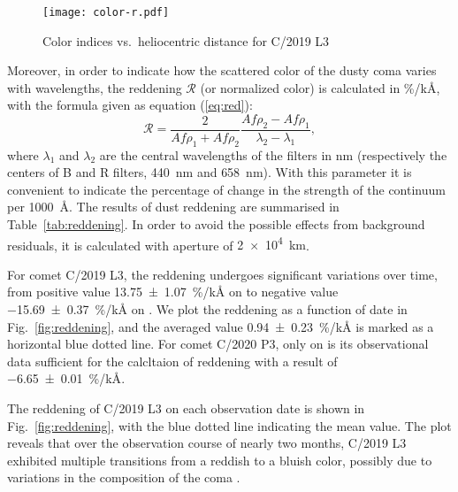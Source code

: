 \begin{figure}
    \centering
    \texttt{[image: color-r.pdf]} 
    \caption{Color indices vs.\ heliocentric distance for C/2019 L3}\label{fig:color-r}
\end{figure}

Moreover, in order to indicate how the scattered color of the dusty coma varies with wavelengths, the reddening $\mathcal{R}$ (or normalized color) \citep{jewitt_cometary_1986, lara_behaviour_2003, mazzotta_epifani_dust_2011, shi_ccd_2015} is calculated in \si{\percent/\kilo\angstrom}, with the formula given as equation (\ref{eq:red}): 
\begin{equation}
\mathcal{R} = \frac{2}{Af\rho_1 + Af\rho_2} \frac{Af\rho_2 - Af\rho_1}{\lambda_2 - \lambda_1}, 
\label{eq:red}
\end{equation}
where $\lambda_1$ and $\lambda_2$ are the central wavelengths of the filters in \si{\nm} (respectively the centers of B and R filters, {\SI{440}{\nm}} and {\SI{658}{\nm}}). With this parameter it is convenient to indicate the percentage of change in the strength of the continuum per {\SI{1000}{\angstrom}}. The results of dust reddening are summarised in Table~\ref{tab:reddening}. In order to avoid the possible effects from background residuals, it is calculated with aperture of {\SI{2e4}{\km}}. 

For comet C/2019 L3, the reddening undergoes significant variations over time, from positive value {\SI{13.75 +- 1.07}{\percent/\kilo\angstrom}} on  to negative value {\SI{-15.69 +- 0.37}{\percent/\kilo\angstrom}} on . We plot the reddening as a function of date in Fig.~\ref{fig:reddening}, and the averaged value {\SI{0.94 +- 0.23}{\percent/\kilo\angstrom}} is marked as a horizontal blue dotted line. For comet C/2020 P3, only on  is its observational data sufficient for the calcltaion of reddening with a result of {\SI{-6.65 +- 0.01}{\percent/\kilo\angstrom}}. 

The reddening of C/2019 L3 on each observation date is shown in Fig.~\ref{fig:reddening}, with the blue dotted line indicating the mean value. The plot reveals that over the observation course of nearly two months, C/2019 L3 exhibited multiple transitions from a reddish to a bluish color, possibly due to variations in the composition of the coma \citep{ivanova_colour_2017}. 

